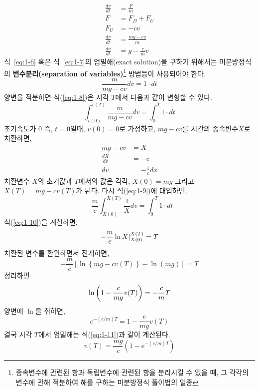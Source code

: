 \begin{align}
\frac{dv}{dt}&=\frac{F}{m}\\
F&=F_{D}+F_{U}\\
F_{U}&=-cv\label{eq:1-7}\\
\frac{dv}{dt}&=\frac{mg-cv}{m}\label{eq:1-6}\\
\frac{dv}{dt}&=g-\frac{c}{m}v\label{eq:1-7}
\end{align}
식~\ref{eq:1-6} 혹은 식~\ref{eq:1-7}의 엄밀해(exact solution)을 구하기 위해서는 미분방정식의 \textbf{변수분리(separation of variables)}\footnote{종속변수에 관련된 항과 독립변수에 관련된 항을 분리시킬 수 있을 때, 그 각각의 변수에 관해 적분하여 해를 구하는 미분방정식 풀이법의 일종} 방법등이 사용되어야 한다.
\begin{equation}
\frac{m}{mg-cv}dv=1\cdot dt
\label{eq:1-8}
\end{equation}
양변을 적분하면 식(\ref{eq:1-8})은 시각 $T$에서 다음과 같이 변형할 수 있다.
\begin{equation}
\int_{v(0)}^{v(T)}\frac{m}{mg-cv}dv=\int_{0}^{T}1\cdot dt
\label{eq:1-9}
\end{equation}
초기속도가 $0$ 즉, $t=0$일때, $v(0)=0$로 가정하고, $mg-cv$를 시간의 종속변수$X$로 치환하면,
\begin{align}
mg-cv&=X\\
\frac{dX}{dv}&=-c\\
dv&=-\frac{1}{c}dx
\end{align}
치환변수 $X$의 초기값과 $T$에서의 값은 각각, $X(0)=mg$ 그리고 $X(T)=mg-cv(T)$가 된다. 다시 식(\ref{eq:1-9})에 대입하면,
\begin{equation}
-\frac{m}{c}\int_{X(0)}^{X(T)}\frac{1}{X}dv=\int_{0}^{T}1\cdot dt
\label{eq:1-10}
\end{equation}
식(\ref{eq:1-10})을 계산하면,
\begin{equation}
-\frac{m}{c}\ln X\arrowvert_{X(0)}^{X(T)}=T
\end{equation}
치환된 변수를 환원하면서 전개하면,
\begin{equation}
-\frac{m}{c}\left[\ln\left\{mg-cv(T)\right\}-\ln(mg)\right] = T
\end{equation}
정리하면
\begin{equation}
\ln\left(1-\frac{c}{mg}v(T)\right) = -\frac{c}{m}T\\
\end{equation}
양변에 $\ln$을 취하면,
\begin{equation}
e^{-(c/m)T}=1-\frac{c}{mg}v(T)
\end{equation}
결국 시각 $T$에서 엄밀해는 식(\ref{eq:1-11})과 같이 계산된다.
\begin{equation}
v(T)=\frac{mg}{c}\left(1-e^{-(c/m)T}\right)
\label{eq:1-11}
\end{equation}

